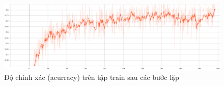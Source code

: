\begin{figure}[!ht]
    \begin{center}
        \includegraphics[width=\linewidth]{asset/image/first-result.png}
        \caption{Độ chính xác (acurracy) trên tập train sau các bước lặp}
        \label{fig:first-result}
    \end{center}
\end{figure}




